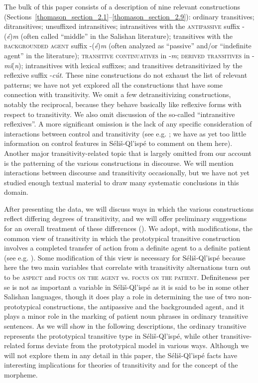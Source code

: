 \documentclass[output=paper,colorlinks,citecolor=brown]{langscibook}
\begin{document}
The bulk of this paper consists of a description of nine relevant
constructions (Sections~\ref{thomason_section_2.1}--\ref{thomason_section_2.9}): 
ordinary transitives; ditransitives;
unsuffixed intransitives; intransitives with the
\textsc{antipassive} suffix -(\emph{\'e})\emph{m} (often called
``middle'' in the Salishan literature); transitives with the
\textsc{backgrounded agent} suffix -(\emph{\'e})\emph{m} (often
analyzed as ``passive'' and/or ``indefinite agent'' in the
literature); \textsc{transitive continuatives} in -\emph{m};
\textsc{derived transitives} in -\emph{m\'i}(\emph{n});
intransitives with lexical suffixes; and transitives
detransitivized by the reflexive suffix -\emph{c\'ut}.  These nine
constructions do not exhaust the list of relevant patterns; we have
not yet explored all the constructions that have some connection
with transitivity.  We omit a few detransitivizing constructions,
notably the reciprocal, because they behave basically like
reflexive forms with respect to transitivity.  We also omit
discussion of the so-called ``intransitive reflexives''.  A more
significant omission is the lack of any specific consideration of
interactions between control and transitivity (see
e.g. \citealt{Thompson:1985}; we have as yet too little information
on control features in S\'eli\v{s}-Ql'isp\'e to comment on them
here).  Another major transitivity-related topic that is largely
omitted from our account is the patterning of the various
constructions in discourse.  We will mention interactions between
discourse and transitivity occasionally, but we have not yet
studied enough textual material to draw many systematic conclusions
in this domain.


  After presenting the data, we will discuss ways in which the
  various constructions reflect differing degrees of transitivity,
  and we will offer preliminary suggestions for an overall treatment
  of these differences ().  We adopt, with modifications, the
  common view of transitivity in which the prototypical transitive
  construction involves a completed transfer of action from a
  definite agent to a definite patient (see
  e.g. \citealt{Hopper&Thompson:1980}).  Some modification of this view is
  necessary for
  S\'eli\v{s}-Ql'isp\'e because here the two main variables that
  correlate with transitivity alternations turn out to be \textsc{aspect} and \textsc{focus on the agent} vs. \textsc{focus on the
    patient}.  Definiteness per se is not as important a variable in
  S\'eli\v{s}-Ql'isp\'e as it is said to be in some other Salishan
  languages, though it does play a role in determining the use of two
  non-prototypical constructions, the antipassive and the
  backgrounded agent, and it plays a minor role in the marking of
  patient noun phrases in ordinary transitive sentences.  As we will
  show in the following descriptions, the ordinary transitive
  represents the prototypical transitive type in
  S\'eli\v{s}-Ql'isp\'e, while other transitive-related forms deviate
  from the prototypical model in various ways.  Although we will not
  explore them in any detail in this paper, the S\'eli\v{s}-Ql'isp\'e
  facts have interesting implications for theories of transitivity
  and for the concept of the morpheme.
\end{document}
